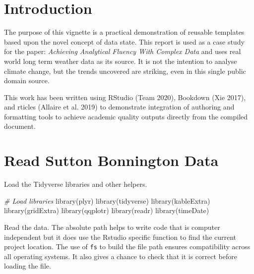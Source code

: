 \documentclass{article}
\title{\myTitleMainTitle}
\author{
    Dr Paul J. Palmer
   \\
    Wolfson School of Mechanical, Electrical and Manufacturing Engineering \\
    Loughborough University \\
  Leicestershire VC55 \\
  \texttt{\href{mailto:p.j.palmer@lboro.ac.uk}{\nolinkurl{p.j.palmer@lboro.ac.uk}}} \\
  }
\newenvironment{Shaded}{\begin{snugshade}}{\end{snugshade}}
\newcommand{\CommentTok}[1]{\textcolor[rgb]{0.56,0.35,0.01}{\textit{#1}}}
\newcommand{\FunctionTok}[1]{\textcolor[rgb]{0.00,0.00,0.00}{#1}}
\newcommand{\NormalTok}[1]{#1}
\begin{document}
\maketitle


\begin{abstract}
\myAbstract
\end{abstract}


\hypertarget{introduction}{%
\section{Introduction}\label{introduction}}

The purpose of this vignette is a practical demonstration of reusable templates based upon the novel concept of data state. This report is used as a case study for the paper: \emph{Achieving Analytical Fluency With Complex Data} and uses real world long term weather data as its source. It is not the intention to analyse climate change, but the trends uncovered are striking, even in this single public domain source.

This work has been written using RStudio (Team 2020), Bookdown (Xie 2017), and rticles (Allaire et al. 2019) to demonstrate integration of authoring and formatting tools to achieve academic quality outputs directly from the compiled document.

\hypertarget{read-sutton-bonnington-data}{%
\section{Read Sutton Bonnington Data}\label{read-sutton-bonnington-data}}

Load the Tidyverse libraries and other helpers.

\begin{Shaded}
\begin{Highlighting}[]
\CommentTok{\# Load libraries}
\FunctionTok{library}\NormalTok{(plyr)}
\FunctionTok{library}\NormalTok{(tidyverse)}
\FunctionTok{library}\NormalTok{(kableExtra)}
\FunctionTok{library}\NormalTok{(gridExtra)}
\FunctionTok{library}\NormalTok{(qqplotr)}
\FunctionTok{library}\NormalTok{(readr)}
\FunctionTok{library}\NormalTok{(timeDate)}
\end{Highlighting}
\end{Shaded}

Read the data. The absolute path helps to write code that is computer independent but it does use the Rstudio specific function to find the current project location. The use of \texttt{fs} to build the file path ensures compatibility across all operating systems. It also gives a chance to check that it is correct before loading the file.
\end{document}
